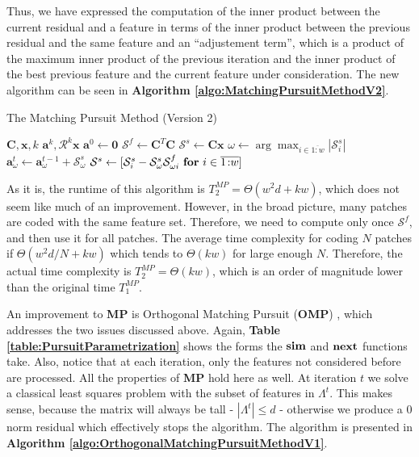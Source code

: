 \documentclass[12pt,a4paper,oneside,english]{UPBThesis}
\newcommand{\hcrange}[2]{\overline{{#1}\colon\!\!{#2}}}
\begin{document}
Thus, we have expressed the computation of the inner product between the current residual and a feature in terms of the inner product between the previous residual and the same feature and an ``adjustement term'', which is a product of the maximum inner product of the previous iteration and the inner product of the best previous feature and the current feature under consideration. The new algorithm can be seen in \textbf{Algorithm \ref{algo:MatchingPursuitMethodV2}}.

\begin{algorithm}
\caption{The Matching Pursuit Method (Version 2)}
\label{algo:MatchingPursuitMethodV2}
\begin{algorithmic}
\Require $\textbf{C},\textbf{x},k$
\Ensure $\textbf{a}^k,\mathcal{R}^k\textbf{x}$
\State $\textbf{a}^0 \gets \textbf{0}$
\State $\mathcal{S}^f \gets \textbf{C}^T\textbf{C}$
\State $\mathcal{S}^s \gets \textbf{C}\textbf{x}$
\For {$t = \hcrange{1}{k}$}
\State $\omega \gets \arg \max_{i \in \hcrange{1}{w}} \left| \mathcal{S}_i^s \right|$
\State $\textbf{a}_\omega^t \gets \textbf{a}_\omega^{t-1} + \mathcal{S}_\omega^s$
\State $\mathcal{S}^s \gets [ \mathcal{S}_i^s - \mathcal{S}_\omega^s \mathcal{S}_{\omega i}^f ~ \mbox{\textbf{for} $i \in \hcrange{1}{w}$} ]$
\EndFor
\end{algorithmic}
\end{algorithm}

As it is, the runtime of this algorithm is $T_2^{MP} = \Theta(w^2d + kw)$, which does not seem like much of an improvement. However, in the broad picture, many patches are coded with the same feature set. Therefore, we need to compute only once $\mathcal{S}^f$, and then use it for all patches. The average time complexity for coding $N$ patches if $\Theta(w^2d/N + kw)$ which tends to $\Theta(kw)$ for large enough $N$. Therefore, the actual time complexity is $T_2^{MP} = \Theta(kw)$, which is an order of magnitude lower than the original time $T_1^{MP}$.

An improvement to \textbf{MP} is Orthogonal Matching Pursuit (\textbf{OMP}) \cite{matchingpursuit2,orthopursuit}, which addresses the two issues discussed above. Again, \textbf{Table \ref{table:PursuitParametrization}} shows the forms the $\text{\textbf{sim}}$ and $\text{\textbf{next}}$ functions take. Also, notice that at each iteration, only the features not considered before are processed. All the properties of \textbf{MP} hold here as well. At iteration $t$ we solve a classical least squares problem with the subset of features in $\Lambda^t$. This makes sense, because the matrix will always be tall - $\left| \Lambda^t \right| \leq d$ - otherwise we produce a $0$ norm residual which effectively stops the algorithm. The algorithm is presented in \textbf{Algorithm \ref{algo:OrthogonalMatchingPursuitMethodV1}}.
\end{document}
